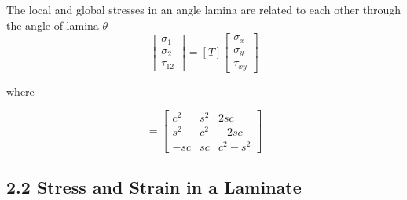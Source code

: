 \documentclass[Afour,sagev,times]{sagej}
\begin{document}
The local and global stresses in an angle lamina are related to each other through the angle of
lamina $\theta$
\begin{equation}
	\left[\begin{array}{l}\sigma_{1} \\ \sigma_{2} \\ \tau_{12
			}\end{array}\right]=[T]\left[\begin{array}{l}\sigma_{x} \\ \sigma_{y} \\
	\tau_{xy}\end{array}\right]
\end{equation}

where 

\begin{equation}
	[T]=\left[\begin{array}{ccc}c^{2} & s^{2} & 2 s c \\ s^{2} & c^{2} & -2 s c \\ -s c & s c &
	c^{2}-s^{2}\end{array}\right] 
\end{equation}

\subsection{2.2 Stress and Strain in a Laminate}
\end{document}
